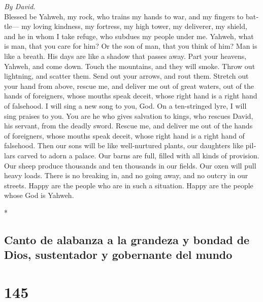\begin{paracol}{2}
\begin{otherlanguage}{english}
\emph{By David.}\\
 Blessed be Yahweh, my rock, who trains my hands to war,
and my fingers to battle---  my loving kindness, my
fortress, my high tower, my deliverer, my shield, and he in whom I take
refuge, who subdues my people under me.  Yahweh, what is
man, that you care for him? Or the son of man, that you think of him?
 Man is like a breath. His days are like a shadow that
passes away.  Part your heavens, Yahweh, and come down.
Touch the mountains, and they will smoke.  Throw out
lightning, and scatter them. Send out your arrows, and rout them.
 Stretch out your hand from above, rescue me, and deliver
me out of great waters, out of the hands of foreigners, 
whose mouths speak deceit, whose right hand is a right hand of
falsehood.  I will sing a new song to you, God. On a
ten-stringed lyre, I will sing praises to you.  You are
he who gives salvation to kings, who rescues David, his servant, from
the deadly sword.  Rescue me, and deliver me out of the
hands of foreigners, whose mouths speak deceit, whose right hand is a
right hand of falsehood.  Then our sons will be like
well-nurtured plants, our daughters like pillars carved to adorn a
palace.  Our barns are full, filled with all kinds of
provision. Our sheep produce thousands and ten thousands in our fields.
 Our oxen will pull heavy loads. There is no breaking in,
and no going away, and no outcry in our streets.  Happy
are the people who are in such a situation. Happy are the people whose
God is Yahweh.

\end{otherlanguage}

\switchcolumn[0]*

\hypertarget{canto-de-alabanza-a-la-grandeza-y-bondad-de-dios-sustentador-y-gobernante-del-mundo}{%
\subsection{Canto de alabanza a la grandeza y bondad de Dios,
sustentador y gobernante del
mundo}\label{canto-de-alabanza-a-la-grandeza-y-bondad-de-dios-sustentador-y-gobernante-del-mundo}}

\hypertarget{section-288}{%
\section{145}\label{section-288}}


\end{paracol}
